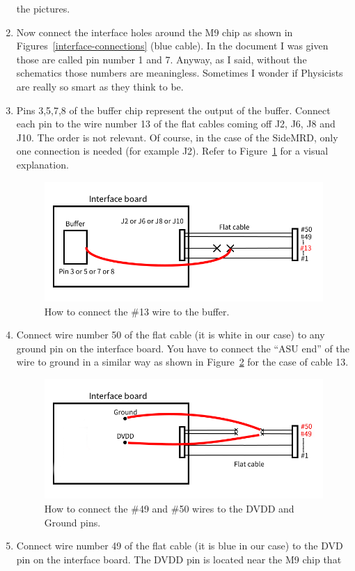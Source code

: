 \begin{enumerate}
  the pictures.
\item Now connect the interface holes around the M9 chip as shown in
  Figures~\ref{interface-connections} (blue cable). In the document I was given
  those are called pin number 1 and 7. Anyway, as I said, without the schematics
  those numbers are meaningless. Sometimes I wonder if Physicists are really so
  smart as they think to be.
\item Pins 3,5,7,8 of the buffer chip represent the output of the
  buffer. Connect each pin to the wire number 13 of the flat cables coming off
  J2, J6, J8 and J10. The order is not relevant. Of course, in the case of the
  SideMRD, only one connection is needed (for example J2). Refer to
  Figure~\ref{connection_flat_cable_1} for a visual explanation.
  \begin{figure}[H]
    \centering \includegraphics[width=0.6\linewidth]{connection_flat_cable_1}
    \caption{How to connect the \#13 wire to the buffer.}%
    \label{connection_flat_cable_1}
  \end{figure}
\item Connect wire number 50 of the flat cable (it is white in our case) to any
  ground pin on the interface board. You have to connect the ``ASU end'' of the
  wire to ground in a similar way as shown in Figure~\ref{connection_flat_cable_2}
  for the case of cable 13.
    \begin{figure}[H]
    \centering \includegraphics[width=0.6\linewidth]{connection_flat_cable_2}
    \caption{How to connect the \#49 and \#50 wires to the DVDD and Ground pins.}%
    \label{connection_flat_cable_2}
  \end{figure}
\item Connect wire number 49 of the flat cable (it is blue in our case) to the
  DVD pin on the interface board. The DVDD pin is located near the M9 chip that

\end{enumerate}
